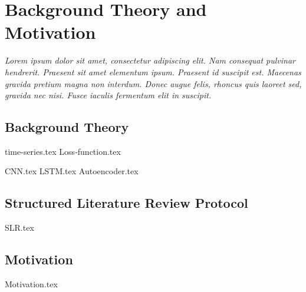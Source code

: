 \chapter{Background Theory and Motivation}\label{T-B}
\label{cha:TheoryAndBackground}

{\it Lorem ipsum dolor sit amet, consectetur adipiscing elit. Nam consequat pulvinar hendrerit. Praesent sit amet elementum ipsum. Praesent id suscipit est. Maecenas gravida pretium magna non interdum. Donec augue felis, rhoncus quis laoreet sed, gravida nec nisi. Fusce iaculis fermentum elit in suscipit.}



\section{Background Theory}
\label{sec:no1}
{time-series.tex}
{Loss-function.tex}

{CNN.tex}
{LSTM.tex}
{Autoencoder.tex}



\section{Structured Literature Review Protocol}
{SLR.tex}



\section{Motivation}
\label{sec:no2}
{Motivation.tex}
